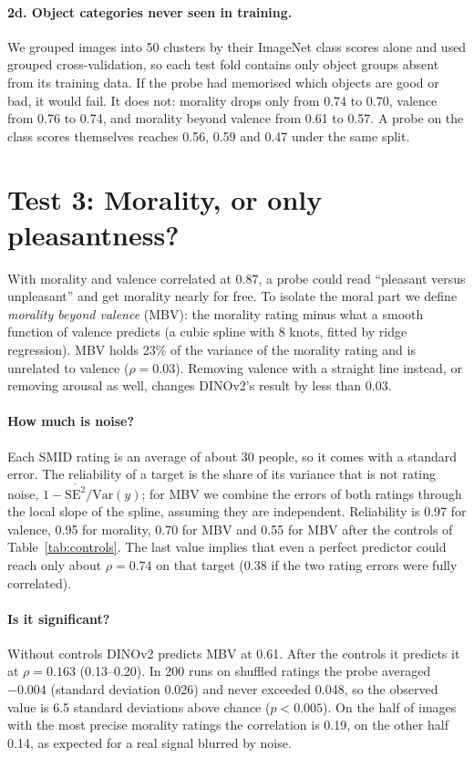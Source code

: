 \documentclass[11pt]{article}
\begin{document}
\paragraph{2d. Object categories never seen in training.} We grouped images into 50 clusters by their ImageNet class scores alone and used grouped cross-validation, so each test fold contains only object groups absent from its training data. If the probe had memorised which objects are good or bad, it would fail. It does not: morality drops only from 0.74 to 0.70, valence from 0.76 to 0.74, and morality beyond valence from 0.61 to 0.57. A probe on the class scores themselves reaches 0.56, 0.59 and 0.47 under the same split.

\section{Test 3: Morality, or only pleasantness?}\label{sec:mbv}

With morality and valence correlated at 0.87, a probe could read ``pleasant versus unpleasant'' and get morality nearly for free. To isolate the moral part we define \emph{morality beyond valence} (MBV): the morality rating minus what a smooth function of valence predicts (a cubic spline with 8 knots, fitted by ridge regression). MBV holds 23\% of the variance of the morality rating and is unrelated to valence ($\rho=0.03$). Removing valence with a straight line instead, or removing arousal as well, changes DINOv2's result by less than 0.03.

\paragraph{How much is noise?} Each SMID rating is an average of about 30 people, so it comes with a standard error. The reliability of a target is the share of its variance that is not rating noise, $1-\overline{\mathrm{SE}^2}/\mathrm{Var}(y)$; for MBV we combine the errors of both ratings through the local slope of the spline, assuming they are independent. Reliability is 0.97 for valence, 0.95 for morality, 0.70 for MBV and 0.55 for MBV after the controls of Table~\ref{tab:controls}. The last value implies that even a perfect predictor could reach only about $\rho=0.74$ on that target (0.38 if the two rating errors were fully correlated).

\paragraph{Is it significant?} Without controls DINOv2 predicts MBV at 0.61. After the controls it predicts it at $\rho=0.163$ (0.13--0.20). In 200 runs on shuffled ratings the probe averaged $-0.004$ (standard deviation 0.026) and never exceeded 0.048, so the observed value is 6.5 standard deviations above chance ($p<0.005$). On the half of images with the most precise morality ratings the correlation is 0.19, on the other half 0.14, as expected for a real signal blurred by noise.
\end{document}
